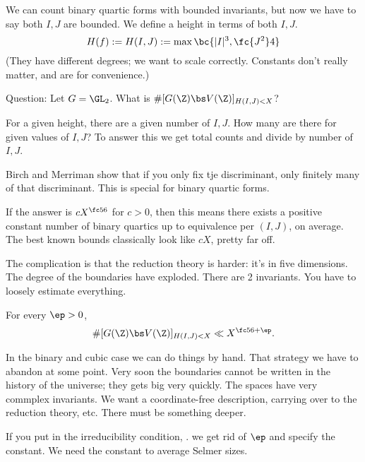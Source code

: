 We can count binary quartic forms with bounded invariants, but now we have to say both $I,J$ are bounded. We define a height  in terms of both $I,J$. 
\[
H(f): = H(I,J) := \max\bc{|I|^3, \fc{J^2}4}
\]
(They have different degrees; we want to scale correctly. Constants don't really matter, and are for convenience.)

Question: Let $G=\GL_2$. What is $\#[G(\Z)\bs V(\Z)]_{H(I,J)<X}$?

For a given height, there are a given number of $I,J$. How many are there for given values of $I,J$? To answer this we get total counts and divide by number of $I,J$.

Birch and Merriman show that if you only fix tje discriminant, only finitely many of that discriminant. This is special for binary quartic forms. %

If the answer is $cX^{\fc 56}$ for $c>0$, then this means there exists a positive constant number of binary quartics up to equivalence per $(I,J)$, on average. The best known bounds classically look like $cX$, pretty far off.

The complication is that the reduction theory is harder: it's in five dimensions. The degree of the boundaries have exploded. There are 2 invariants. You have to loosely estimate everything.
\begin{thm}
For every $\ep>0$,
\[\#[G(\Z)\bs V(\Z)]_{H(I,J)<X}\ll X^{\fc 56+\ep}.\]
\end{thm}

In the binary and cubic case we can do things by hand. That strategy we have to abandon at some point. Very soon the boundaries cannot be written in the history of the universe; they gets big very quickly. The spaces have very commplex invariants. We want a coordinate-free description, carrying over to the reduction theory, etc. There must be something deeper.

If you put in the irreducibility condition, . we get rid of $\ep$ and specify the constant. We need the constant to average Selmer sizes.

